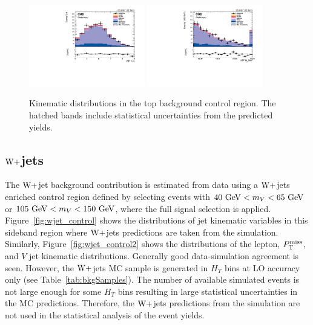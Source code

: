 \begin{figure}[!htbp]
\includegraphics[width=0.45\textwidth]{Plots/plots/DibosonBoostedElMuCuts13TeV_TTBarControlRegion_CHS_vbf_maxpt_jj_Deta.pdf}
\includegraphics[width=0.45\textwidth]{Plots/plots/DibosonBoostedElMuCuts13TeV_TTBarControlRegion_CHS_vbf_maxpt_jj_m.pdf}
\caption{Kinematic distributions in the top background control region. The hatched bands include statistical uncertainties from the predicted yields.}
\label{fig:top_control}
\end{figure}


\subsection{$\mathrm{W}+$jets}
The $\mathrm{W}+$jet background contribution is estimated from data using a $\mathrm{W}+$jets enriched control region defined by selecting events with $40~\mathrm{GeV} < m_{V} < 65~\mathrm{GeV}$ or $105~\mathrm{GeV} < m_{V} < 150~\mathrm{GeV}$, where the full signal selection is applied. Figure~\ref{fig:wjet_control} shows the distributions of jet kinematic variables in this sideband region where $\mathrm{W}+$jets predictions are taken from the simulation. Similarly, Figure~\ref{fig:wjet_control2} shows the distributions of the lepton, $P_\mathrm{T}^{\mathrm{miss}}$, and $V$ jet kinematic distributions. Generally good data-simulation agreement is seen. However, the $\mathrm{W}+$jets MC sample is generated in $H_{T}$ bins at LO accuracy only (see Table~\ref{tab:bkgSamples}). The number of available simulated events is not large enough for some $H_{T}$ bins resulting in large statistical uncertainties in the MC predictions. Therefore, the $\mathrm{W}+$jets predictions from the simulation are not used in the statistical analysis of the event yields.

